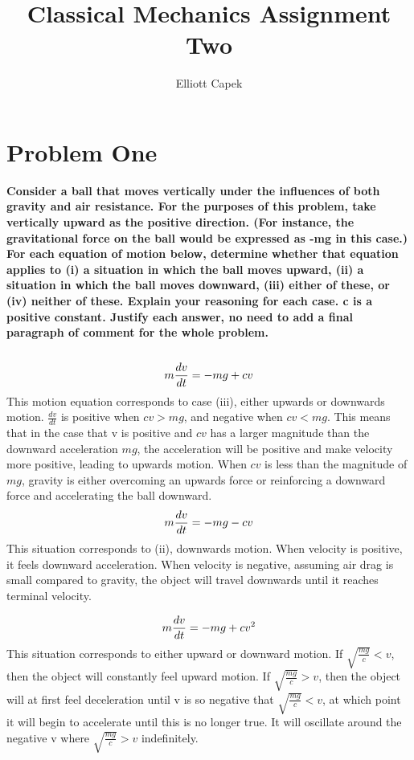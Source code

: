 \documentclass[10pt]{article} %
\title{Classical Mechanics Assignment Two}
\author{Elliott Capek}
\begin{document}
\maketitle{}

\section{Problem One}
\textbf{Consider  a  ball  that  moves  vertically  under  the  influences  of  both  gravity  and  air resistance.  For  the  purposes  of  this  problem,  take  vertically  upward  as  the  positive direction. (For instance, the gravitational force on the ball would be expressed as -mg in this case.) For each equation of motion below, determine whether that equation applies 
to (i) a situation in which the ball moves upward, (ii) a situation in which the ball moves 
downward, (iii) either of these, or (iv) neither of these. Explain your reasoning for each 
case. c is a positive constant. Justify each answer, no need  to add a  final paragraph of 
comment for the whole problem.} \\ \\

\begin{equation}
  m\frac{dv}{dt} = -mg + cv\\
\end{equation}
This motion equation corresponds to case (iii), either upwards or downwards motion. $\frac{dv}{dt}$ is positive when $cv > mg$, and negative when $cv < mg$. This means that in the case that v is positive and $cv$ has a larger magnitude than the downward acceleration $mg$, the acceleration will be positive and make velocity more positive, leading to upwards motion. When $cv$ is less than the magnitude of $mg$, gravity is either overcoming an upwards force or reinforcing a downward force and accelerating the ball downward.\\

\begin{equation}
  m\frac{dv}{dt} = -mg - cv\\
\end{equation}
This situation corresponds to (ii), downwards motion. When velocity is positive, it feels downward acceleration. When velocity is negative, assuming air drag is small compared to gravity, the object will travel downwards until it reaches terminal velocity.

\begin{equation}
  m\frac{dv}{dt} = -mg + cv^2\\
\end{equation}
This situation corresponds to either upward or downward motion. If $\sqrt{\frac{mg}{c}} < v$, then the object will constantly feel upward motion. If $\sqrt{\frac{mg}{c}} > v$, then the object will at first feel deceleration until v is so negative that $\sqrt{\frac{mg}{c}} < v$, at which point it will begin to accelerate until this is no longer true. It will oscillate around the negative v where $\sqrt{\frac{mg}{c}} > v$ indefinitely.
\end{document}
